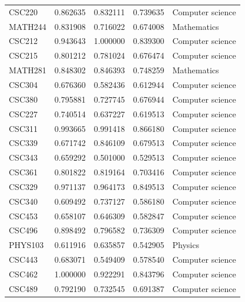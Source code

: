 \documentclass[12pt,a4paper]{article}
\begin{document}
\begin{tabular}{lrrrl}
CSC220          &          0.862635 &        0.832111 &       0.739635 &  Computer science \\
MATH244         &          0.831908 &        0.716022 &       0.674008 &       Mathematics \\
CSC212          &          0.943643 &        1.000000 &       0.839300 &  Computer science \\
CSC215          &          0.801212 &        0.781024 &       0.676474 &  Computer science \\
MATH281         &          0.848302 &        0.846393 &       0.748259 &       Mathematics \\
CSC304          &          0.676360 &        0.582436 &       0.612944 &  Computer science \\
CSC380          &          0.795881 &        0.727745 &       0.676944 &  Computer science \\
CSC227          &          0.740514 &        0.637227 &       0.619513 &  Computer science \\
CSC311          &          0.993665 &        0.991418 &       0.866180 &  Computer science \\
CSC339          &          0.671742 &        0.846109 &       0.679513 &  Computer science \\
CSC343          &          0.659292 &        0.501000 &       0.529513 &  Computer science \\
CSC361          &          0.801822 &        0.819164 &       0.703416 &  Computer science \\
CSC329          &          0.971137 &        0.964173 &       0.849513 &  Computer science \\
CSC340          &          0.609492 &        0.737127 &       0.586180 &  Computer science \\
CSC453          &          0.658107 &        0.646309 &       0.582847 &  Computer science \\
CSC496          &          0.898492 &        0.796582 &       0.736309 &  Computer science \\
PHYS103         &          0.611916 &        0.635857 &       0.542905 &           Physics \\
CSC443          &          0.683071 &        0.549409 &       0.578540 &  Computer science \\
CSC462          &          1.000000 &        0.922291 &       0.843796 &  Computer science \\
CSC489          &          0.792190 &        0.732545 &       0.691387 &  Computer science \\
\bottomrule
\end{tabular}
\end{document}
